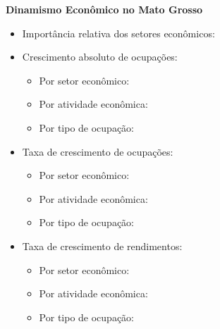 \documentclass[10pt]{beamer}
\begin{document}
\begin{frame}[label=indice_principal_amz_mt]{}

\textit{\hyperlink{indice_principal}{}}

\textbf{Dinamismo Econômico no Mato Grosso}
\vspace{2mm}

\begin{itemize}

\item{Importância relativa dos setores econômicos: \hyperlink{_amz_mt_importancia_relativa}{}}
\vspace{1mm}

\item{Crescimento  absoluto de ocupações:
	\begin{itemize}
	\item{Por setor econômico: \hyperlink{amzmtrkngnocuporsetor}{}}
	\item{Por atividade econômica: \hyperlink{amzmtrkngnocuporatividade}{}}
	\item{Por tipo de ocupação: \hyperlink{amzmtrkngnocuporocupacao}{}}
	\end{itemize}
}
\vspace{1mm}

\item{Taxa de crescimento de ocupações:
	\begin{itemize}
	\item{Por setor econômico: \hyperlink{amzmtrkngtxocuporsetor}{}}
	\item{Por atividade econômica: \hyperlink{amzmtrkngtxocuporatividade}{}}
	\item{Por tipo de ocupação: \hyperlink{amzmtrkngtxocuporocupacao}{}}
	\end{itemize}
}
\vspace{1mm}

\item{Taxa de crescimento de rendimentos:
	\begin{itemize}
	\item{Por setor econômico: \hyperlink{amzmtrkngtxrendaporsetor}{}}
	\item{Por atividade econômica: \hyperlink{amzmtrkngtxrendaporatividade}{}}
	\item{Por tipo de ocupação: \hyperlink{amzmtrkngtxrendaporocupacao}{}}
	\end{itemize}
}
\vspace{1mm}

\end{itemize}

\end{frame}
\end{document}
